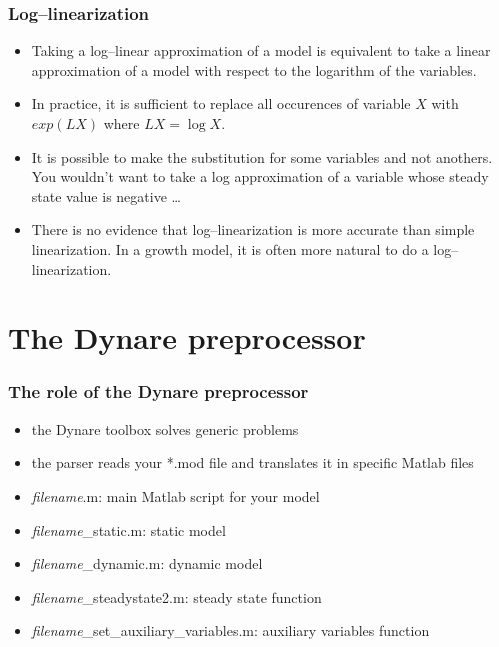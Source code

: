 \documentclass{beamer}
\begin{document}
\begin{frame}
  \frametitle{Log--linearization}
\begin{itemize}
\item Taking a log--linear approximation of a model is equivalent to take a linear approximation of a model with respect to the logarithm of the variables.
\item In practice, it is sufficient to replace all occurences of variable $X$ with $exp(LX)$ where $LX=\log X$.
\item It is possible to make the substitution for some variables and not anothers. You wouldn't want to take a log approximation of a variable whose steady state value is negative \ldots
\item There is no evidence that log--linearization is more accurate than simple linearization. In a growth model, it is often more natural to do a log--linearization.
\end{itemize}
\end{frame}

\section[The Dynare preprocessor]{The Dynare preprocessor}
\begin{frame}
  \frametitle{The role of the Dynare preprocessor}

  \begin{itemize}
  \item the Dynare toolbox solves generic problems
  \item the parser reads your *.mod file and translates it in specific Matlab files
  \item \emph{filename}{\rm.m}: main Matlab script for your model
  \item \emph{filename}{\rm\_static.m}: static model
  \item \emph{filename}{\rm\_dynamic.m}: dynamic model
  \item \emph{filename}{\rm\_steadystate2.m}: steady state function
  \item \emph{filename}{\rm\_set\_auxiliary\_variables.m}: auxiliary
    variables function
  \end{itemize}
\end{frame}
\end{document}
